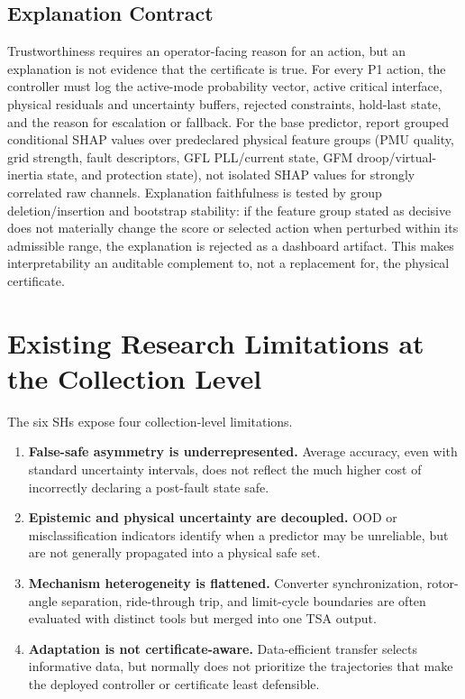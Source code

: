 \documentclass[conference]{IEEEtran}
\begin{document}
\subsection{Explanation Contract}

Trustworthiness requires an operator-facing reason for an action, but an explanation is not evidence that the certificate is true. For every P1 action, the controller must log the active-mode probability vector, active critical interface, physical residuals and uncertainty buffers, rejected constraints, hold-last state, and the reason for escalation or fallback. For the base predictor, report grouped conditional SHAP values over predeclared physical feature groups (PMU quality, grid strength, fault descriptors, GFL PLL/current state, GFM droop/virtual-inertia state, and protection state), not isolated SHAP values for strongly correlated raw channels. Explanation faithfulness is tested by group deletion/insertion and bootstrap stability: if the feature group stated as decisive does not materially change the score or selected action when perturbed within its admissible range, the explanation is rejected as a dashboard artifact. This makes interpretability an auditable complement to, not a replacement for, the physical certificate.

\section{Existing Research Limitations at the Collection Level}

The six SHs expose four collection-level limitations.
\begin{enumerate}
  \item \textbf{False-safe asymmetry is underrepresented.} Average accuracy, even with standard uncertainty intervals, does not reflect the much higher cost of incorrectly declaring a post-fault state safe.
  \item \textbf{Epistemic and physical uncertainty are decoupled.} OOD or misclassification indicators identify when a predictor may be unreliable, but are not generally propagated into a physical safe set.
  \item \textbf{Mechanism heterogeneity is flattened.} Converter synchronization, rotor-angle separation, ride-through trip, and limit-cycle boundaries are often evaluated with distinct tools but merged into one TSA output.
  \item \textbf{Adaptation is not certificate-aware.} Data-efficient transfer selects informative data, but normally does not prioritize the trajectories that make the deployed controller or certificate least defensible.
\end{enumerate}
\end{document}
